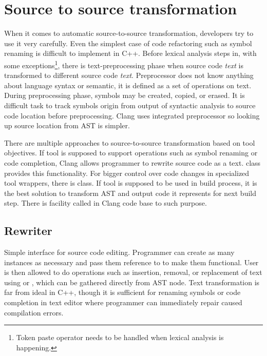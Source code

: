 \section{Source to source transformation}
When it comes to automatic source-to-source transformation, developers try to use it very carefully. Even the simplest case of code refactoring such as symbol renaming is difficult to implement in C++. Before lexical analysis steps in, with some exceptions\footnote{Token paste operator \code{\#\#} needs to be handled when lexical analysis is happening.}, there is text-preprocessing phase when source code \emph{text} is transformed to different source code \emph{text}. Preprocessor does not know anything about language syntax or semantic, it is defined as a set of operations on text. During preprocessing phase, symbols may be created, copied, or erased. It is difficult task to track symbols origin from output of syntactic analysis to source code location before preprocessing. Clang uses integrated preprocessor so looking up source location from AST is simpler.

There are multiple approaches to source-to-source transformation based on tool objectives. If tool is supposed to support operations such as symbol renaming or code completion, Clang allows programmer to rewrite source code as a text.  class provides this functionality. For bigger control over code changes in specialized tool wrappers, there is  class. If tool is supposed to be used in build process, it is the best solution to transform AST and output code it represents for next build step. There is facility called  in Clang code base to such purpose.

\subsection{Rewriter}
Simple interface for source code editing. Programmer can create as many instances as necessary and pass them reference to  to make them functional.  User is then allowed to do operations such as insertion, removal, or replacement of text using  or , which can be gathered directly from AST node. Text transformation is far from ideal in C++, though it is sufficient for renaming symbols or code completion in text editor where programmer can immediately repair caused compilation errors.

